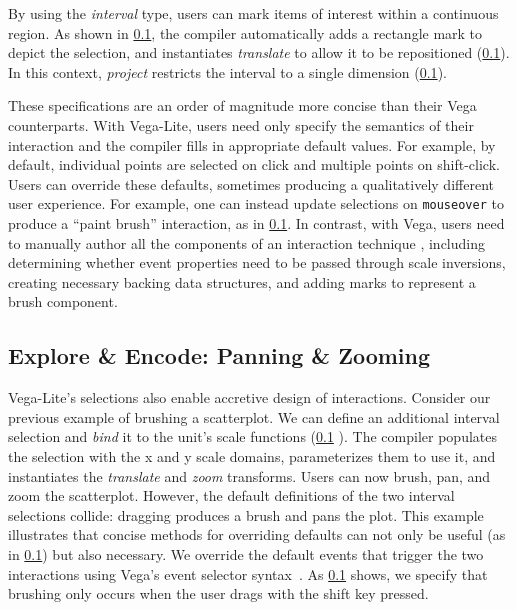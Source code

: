 By using the \emph{interval} type, users can mark items of interest within a
continuous region. As shown in \cref{}, the compiler
automatically adds a rectangle mark to depict the selection, and instantiates
\emph{translate} to allow it to be repositioned (\cref{}). In this context, \emph{project} restricts the interval to a single
dimension (\cref{}).

These specifications are an order of magnitude more concise than their Vega
counterparts. With Vega-Lite, users need only specify the semantics of their
interaction and the compiler fills in appropriate default values. For example,
by default, individual points are selected on click and multiple points on
shift-click. Users can override these defaults, sometimes producing a
qualitatively different user experience. For example, one can instead update
selections on \texttt{mouseover} to produce a ``paint brush'' interaction, as in
\cref{}. In contrast, with Vega, users need to manually
author all the components of an interaction technique ,
including determining whether event properties need to be passed through scale
inversions, creating necessary backing data structures, and adding marks to
represent a brush component.

\subsection{Explore \& Encode: Panning \& Zooming}

Vega-Lite's selections also enable accretive design of interactions. Consider
our previous example of brushing a scatterplot. We can define an additional
interval selection and \emph{bind} it to the unit's scale functions (\cref{}
). The compiler populates the selection with the x and
y scale domains, parameterizes them to use it, and instantiates the
\emph{translate} and \emph{zoom} transforms. Users can now brush, pan, and zoom
the scatterplot. However, the default definitions of the two interval selections
collide: dragging produces a brush and pans the plot. This example illustrates
that concise methods for overriding defaults can not only be useful (as in
\cref{}) but also necessary. We override the default
events that trigger the two interactions using Vega's event selector
syntax~\cite{reactive-vega-model}. As \cref{} shows, we
specify that brushing only occurs when the user drags with the shift key
pressed.

